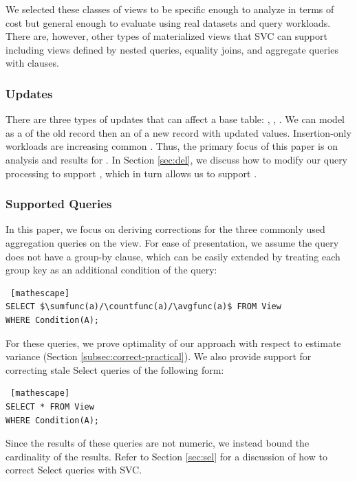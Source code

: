 \vspace{0.25em}

We selected these classes of views to be specific enough to analyze in terms of cost but general enough to evaluate using real datasets and query workloads.
There are, however, other types of materialized views that SVC can support including views defined by nested queries, equality joins, and aggregate queries with \havingfunc clauses.

\subsubsection{Updates}
There are three types of updates that can affect a base table: \insertion, \delete, \update.
We can model \update as a \delete of the old record then an \insertion of a new record with updated values. 
Insertion-only workloads are increasing common .
Thus, the primary focus of this paper is on analysis and results for \insertion. In Section \ref{sec:del}, we discuss how to modify our query processing to support \delete, which in turn allows us to support \update.

\subsubsection{Supported Queries}
In this paper, we focus on deriving corrections for the three commonly used aggregation queries on the view.
For ease of presentation, we assume the query does not have a group-by clause, which can be easily extended by treating each group key as an additional condition of the query: 
\begin{lstlisting} [mathescape]
SELECT $\sumfunc(a)/\countfunc(a)/\avgfunc(a)$ FROM View 
WHERE Condition(A);
\end{lstlisting}
For these queries, we prove optimality of our approach with respect to estimate variance (Section \ref{subsec:correct-practical}). 
We also provide support for correcting stale Select queries of the following form:
\begin{lstlisting} [mathescape]
SELECT * FROM View 
WHERE Condition(A);
\end{lstlisting}
Since the results of these queries are not numeric, we instead bound the cardinality of the results.
Refer to Section \ref{sec:sel} for a discussion of how to correct Select queries with SVC. 



